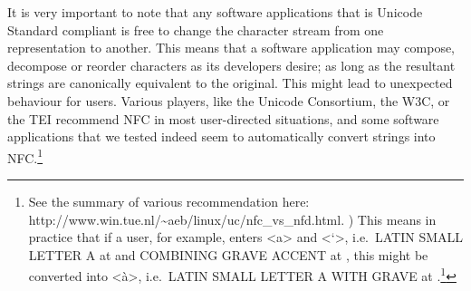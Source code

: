 {{{{{{{{{{{{{{{{{{{{{{{{{{{It is very important to note that any software applications that is Unicode Standard compliant is free to change the character stream from one representation to another. This means that a software application may compose, decompose or reorder characters as its developers desire; as long as the resultant strings are canonically equivalent to the original. This might lead to unexpected behaviour for users. Various players, like the Unicode Consortium, the W3C, or the TEI recommend NFC in most user-directed situations, and some software applications that we tested indeed seem to automatically convert strings into NFC.\footnote{See the summary of various recommendation here: http://www.win.tue.nl/\textasciitilde{}aeb/linux/uc/nfc\_vs\_nfd.html. ) This means in practice that if a user, for example, enters <a> and <`>, i.e.~LATIN SMALL LETTER A at  and COMBINING GRAVE ACCENT at , this might be converted into <à>, i.e.~LATIN SMALL LETTER A WITH GRAVE at .\footnote{The behaviour of software applications can be quite erratic in this respect. For example, Apple's TextEdit does not do any conversion on text entry. However, when you copy and paste some text inside the same document in ``rich text mode'' (i.e.~RTF-format), it will be transformed into NFC on paste. Saving a document does not do any conversion to the glyphs on screen, but it will save the characters in NFC.)

\subsection{Pitfall: Characters are not glyphs}\label{pitfall-characters-are-not-glyphs}

A central principle of Unicode is the distinction between character and glyph. A character is the abstract notion of a symbol in a writing system, while a glyph is the concrete drawing of such a symbol. In practice, there is a complex interaction between characters and glyphs. A single Unicode character may of course be rendered as a single glyph. However, a character may also be a `piece' of a glyph, or vice-versa. Actually, all possible relations between glyphs and characters are attested.

}}}}}}}}}}}}}}}}}}}}}}}}}}}}}

